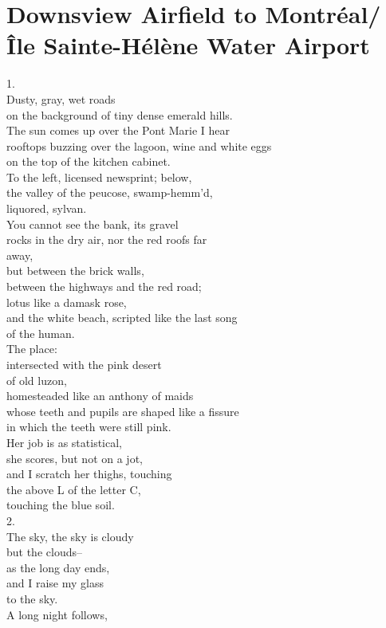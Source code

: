 \documentclass[smalldemyvopaper,11pt,twoside,onecolumn,openright,extrafontsizes]{memoir}
\begin{document}
\chapter{Downsview Airfield to Montréal/Île Sainte-Hélène Water Airport}
1.
\\Dusty, gray, wet roads
\\on the background of tiny dense emerald hills.
\\The sun comes up over the Pont Marie I hear
\\rooftops buzzing over the lagoon, wine and white eggs
\\on the top of the kitchen cabinet.
\\To the left, licensed newsprint; below,
\\the valley of the peucose, swamp-hemm'd,
\\liquored, sylvan.
\\You cannot see the bank, its gravel
\\rocks in the dry air, nor the red roofs far
\\away,
\\but between the brick walls,
\\between the highways and the red road;
\\lotus like a damask rose,
\\and the white beach, scripted like the last song
\\of the human.
\\The place:
\\intersected with the pink desert
\\of old luzon,
\\homesteaded like an anthony of maids
\\whose teeth and pupils are shaped like a fissure
\\in which the teeth were still pink.
\\Her job is as statistical,
\\she scores, but not on a jot,
\\and I scratch her thighs, touching
\\the above L of the letter C,
\\touching the blue soil.
\\2.
\\The sky, the sky is cloudy
\\but the clouds--
\\as the long day ends,
\\and I raise my glass
\\to the sky.
\\A long night follows,
\end{document}
